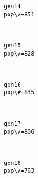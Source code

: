 \documentclass[11pt]{article}
\begin{document}
    \begin{Verbatim}[commandchars=\\\{\}]
gen14
pop\#=851

    \end{Verbatim}

    \begin{center}
    \end{center}
    { \hspace*{\fill} \\}
    
    \begin{Verbatim}[commandchars=\\\{\}]
gen15
pop\#=828

    \end{Verbatim}

    \begin{center}
    \end{center}
    { \hspace*{\fill} \\}
    
    \begin{Verbatim}[commandchars=\\\{\}]
gen16
pop\#=835

    \end{Verbatim}

    \begin{center}
    \end{center}
    { \hspace*{\fill} \\}
    
    \begin{Verbatim}[commandchars=\\\{\}]
gen17
pop\#=806

    \end{Verbatim}

    \begin{center}
    \end{center}
    { \hspace*{\fill} \\}
    
    \begin{Verbatim}[commandchars=\\\{\}]
gen18
pop\#=763

    \end{Verbatim}
\end{document}
